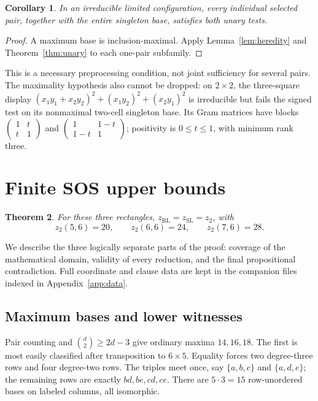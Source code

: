 \documentclass[11pt,a4paper]{article}
\newtheorem{theorem}{Theorem}[section]
\newtheorem{corollary}[theorem]{Corollary}
\theoremstyle{definition}
\newcommand{\zr}{z_{\mathrm{RL}}}
\newcommand{\zs}{z_{\mathrm{SL}}}
\newcommand{\zt}{z_2}
\begin{document}
\begin{corollary}\label{cor:unaryfilter}
In an irreducible limited configuration, every individual selected pair,
together with the entire singleton base, satisfies both unary tests.
\end{corollary}
\begin{proof}
A maximum base is inclusion-maximal. Apply Lemma~\ref{lem:heredity}
and Theorem~\ref{thm:unary} to each one-pair subfamily.
\end{proof}
This is a necessary preprocessing condition, not joint sufficiency for
several pairs. The maximality hypothesis also cannot be dropped: on
$2\times2$, the three-square display
$(x_1y_1+x_2y_2)^2+(x_1y_2)^2+(x_2y_1)^2$ is irreducible but fails the
signed test on its nonmaximal two-cell singleton base. Its Gram matrices
have blocks $\left(\begin{smallmatrix}1&t\\t&1\end{smallmatrix}\right)$
and $\left(\begin{smallmatrix}1&1-t\\1-t&1\end{smallmatrix}\right)$;
positivity is $0\le t\le1$, with minimum rank three.




\section{Finite SOS upper bounds}
\label{sec:finite}

\begin{theorem}\label{thm:small}
For these three rectangles, $\zr=\zs=\zt$, with
\[
 \zt(5,6)=20,\qquad \zt(6,6)=24,\qquad \zt(7,6)=28.
\]
\end{theorem}

We describe the three logically separate parts of the proof: coverage
of the mathematical domain, validity of every reduction, and the final
propositional contradiction. Full coordinate and clause data are kept in
the companion files indexed in Appendix~\ref{app:data}.

\subsection{Maximum bases and lower witnesses}

Pair counting and $\binom d2\ge2d-3$ give ordinary maxima $14,16,18$.
The first is most easily classified after transposition to $6\times5$.
Equality forces two degree-three rows and four degree-two rows. The
triples meet once, say $\{a,b,c\}$ and $\{a,d,e\}$; the remaining rows
are exactly $bd,be,cd,ce$. There are $5\cdot3=15$ row-unordered bases
on labeled columns, all isomorphic.
\end{document}
